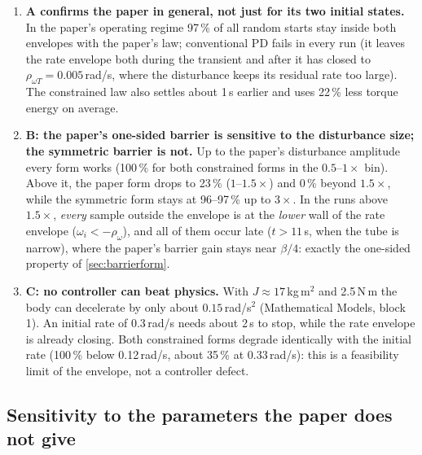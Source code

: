 \begin{projbox}
\begin{enumerate}[leftmargin=*]
  \item \textbf{A confirms the paper in general, not just for its two initial states.} In the paper's operating regime
        97\,\% of all random starts stay inside both envelopes with the paper's law; conventional PD fails in every run
        (it leaves the rate envelope both during the transient and after it has closed to $\rho_{\omega T}=0.005$\,rad/s,
        where the disturbance keeps its residual rate too large). The
        constrained law also settles about 1\,s earlier and uses 22\,\% less torque energy on average.
  \item \textbf{B: the paper's one-sided barrier is sensitive to the disturbance size; the symmetric barrier is not.} Up to
        the paper's disturbance amplitude every form works (100\,\% for both constrained forms in the $0.5$--$1\times$ bin).
        Above it, the paper form drops to 23\,\% ($1$--$1.5\times$) and 0\,\% beyond $1.5\times$, while the symmetric form stays at
        96--97\,\% up to $3\times$. In the runs above $1.5\times$, \emph{every} sample outside the envelope is at the \emph{lower} wall of the rate
        envelope ($\omega_i<-\rho_\omega$), and all of them occur late ($t>11$\,s, when the tube is narrow), where the paper's barrier
        gain stays near $\beta/4$: exactly the one-sided property of \cref{sec:barrierform}.
  \item \textbf{C: no controller can beat physics.} With $J\approx17$\,kg\,m$^2$ and 2.5\,N\,m the body can decelerate by only
        about $0.15$\,rad/s$^2$ (Mathematical Models, block 1). An initial rate of 0.3\,rad/s needs about 2\,s to stop, while
        the rate envelope is already closing. Both constrained forms degrade identically with the initial rate (100\,\%
        below 0.12\,rad/s, about 35\,\% at 0.33\,rad/s): this is a feasibility limit of the envelope, not a controller defect.
\end{enumerate}
\end{projbox}

\subsection{Sensitivity to the parameters the paper does not give}
\label{sec:sens}

